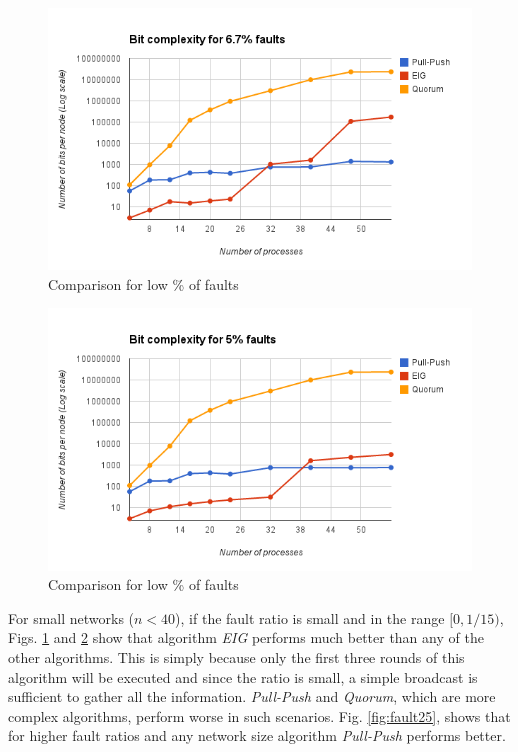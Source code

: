 \begin{figure}[ht]
 \centering
\includegraphics[scale=0.4]{Fault667}
\caption{Comparison for low \% of faults}
 \label{fig:fault667}
\end{figure}

\begin{figure}[ht]
 \centering
\includegraphics[scale=0.4]{Fault5}
\caption{Comparison for low \% of faults}
 \label{fig:fault5}
\end{figure}

For small networks ($n < 40$), if the fault ratio is small and in the range $[0, 1/15)$, Figs. \ref{fig:fault667} and \ref{fig:fault5} show that algorithm \textit{EIG} performs much better than any of the other algorithms. This is simply because only the first three rounds of this algorithm will be executed and since the ratio is small, a simple broadcast is sufficient to gather all the information. \textit{Pull-Push} and \textit{Quorum}, which are more complex algorithms, perform worse in such scenarios. Fig. \ref{fig:fault25}, shows that for higher fault ratios and any network size algorithm \textit{Pull-Push} performs better.

